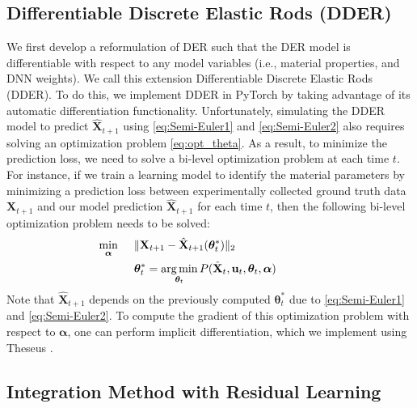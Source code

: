 \subsection{Differentiable Discrete Elastic Rods (DDER)}
\label{sec:Differentiable DER}

We first develop a reformulation of DER such that the DER model is differentiable with respect to any model variables (i.e., material properties, and DNN weights).
We call this extension Differentiable Discrete Elastic Rods (DDER).
To do this, we implement DDER in PyTorch \cite{pytorch} by taking advantage of its automatic differentiation functionality. 
Unfortunately, simulating the DDER model to predict $\hat{\textbf{X}}_{t+1}$ using \eqref{eq:Semi-Euler1} and \eqref{eq:Semi-Euler2}
also requires solving an optimization problem \eqref{eq:opt_theta}. 
As a result, to minimize the prediction loss, we need to solve a bi-level optimization problem at each time $t$. 
For instance, if we train a learning model to identify the material parameters by minimizing a prediction loss between experimentally collected ground truth data $\textbf{X}_{t+1}$ and our model prediction $\hat{\textbf{X}}_{t+1}$ for each time $t$, then 
the following bi-level optimization problem needs to be solved: 
\begin{align}
    \label{eq:pzoptcost}
    & &\underset{\bm{\alpha}}{\min} \hspace{0.5cm}& \|\textbf{X}_{t+1}- \hat{\textbf{X}}_{t+1}(\bm{\theta}^*_t)\|_2 \hspace{3cm}    \\
    &&& \bm{\theta}^*_t = \argmin_{\bm{\theta}_t} P(\hat{\textbf{X}}_t, \vertindu_t, \bm{\theta}_t,\bm{\alpha}) 
\end{align}
Note that  $\hat{\textbf{X}}_{t+1}$ depends on the previously computed $\bm{\theta}^*_t$ due to \eqref{eq:Semi-Euler1} and \eqref{eq:Semi-Euler2}.
To compute the gradient of this optimization problem with respect to $\bm{\alpha}$, one can perform implicit differentiation, which we implement using Theseus \cite{theseus}. 

\subsection{Integration Method with Residual Learning}
\label{sec:integration_NN}

